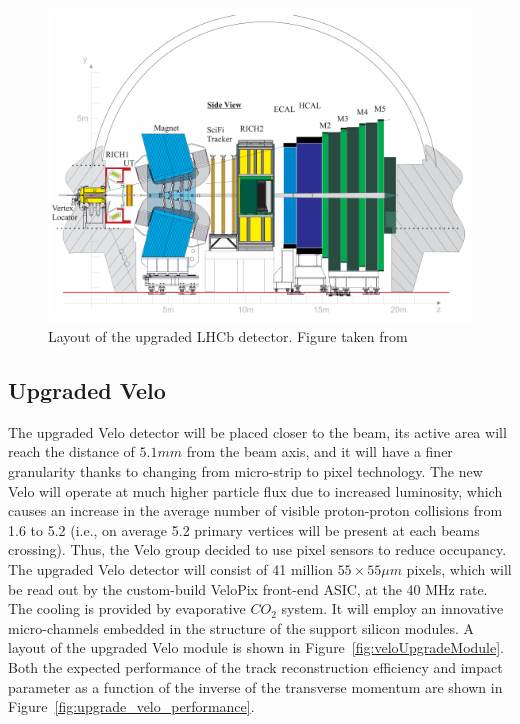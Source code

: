 \begin{figure}[!h]
\centering
\includegraphics[width=\linewidth]{figures/LHCb_upgrade.PNG}
\caption{Layout of the upgraded LHCb detector. Figure taken from~\cite{upgrade_tracker_tdr}
\label{fig:lhcb_upgrade}}
\end{figure}

\subsection{Upgraded Velo}
The upgraded Velo detector will be placed closer to the beam, its active area will reach the distance of $5.1 mm$ from the beam axis, and it will have a finer granularity thanks to changing from micro-strip to pixel technology. The new Velo will operate at much higher particle flux due to increased luminosity, which causes an increase in the average number of visible proton-proton collisions from 1.6 to 5.2 (i.e., on average 5.2 primary vertices will be present at each beams crossing). Thus, the Velo group decided to use pixel sensors to reduce occupancy. The upgraded Velo detector will consist of 41 million $55\times 55 \mu m$ pixels, which will be read out by the custom-build VeloPix front-end ASIC, at the 40 MHz rate. 
The cooling is provided by evaporative $CO_{2}$ system. It will employ an innovative micro-channels embedded in the structure of the support silicon modules.
A layout of the upgraded Velo module is shown in Figure~\ref{fig:veloUpgradeModule}. 
Both the expected performance of the track reconstruction efficiency and impact parameter as a function of the inverse of the transverse momentum are shown in Figure~\ref{fig:upgrade_velo_performance}.    

